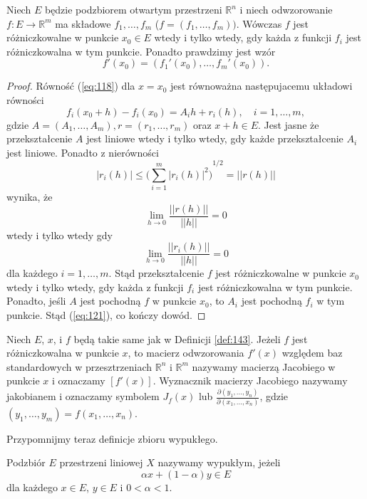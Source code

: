 \documentclass[leqno]{article}
\begin{document}
\begin{justify}
\begin{theorem}
{
    Niech $E$ będzie podzbiorem otwartym przestrzeni $\mathbb{R}^n$ i niech odwzorowanie $f : E \to \mathbb{R}^m$ ma składowe $f_1, \ldots, f_m$ ($f = (f_1, \ldots, f_m))$.
    Wówczas $f$ jest różniczkowalne w punkcie $x_0 \in E$ wtedy i tylko wtedy, gdy każda z funkcji $f_i$ jest różniczkowalna w tym punkcie. Ponadto prawdzimy jest wzór
    \begin{equation}\label{eq:121}
        f'(x_0) = (f_1'(x_0), \ldots, f_m'(x_0)).
    \end{equation}
}
\end{theorem}
\begin{proof}
    Równość (\ref{eq:118}) dla $x = x_0$ jest równoważna następujacemu układowi równości 
    \[
        f_i(x_0 + h) - f_i(x_0) = A_i h + r_i(h), \quad i = 1, \ldots, m,
    \]
    gdzie $A = (A_1, \ldots, A_m), r = (r_1, \ldots, r_m)$ oraz $x + h \in E$. Jest jasne że przekształcenie $A$ jest liniowe 
    wtedy i tylko wtedy, gdy każde przekształcenie $A_i$ jest liniowe. Ponadto z nierówności 
    \[
        |r_i(h)| \leqslant {\Big(\sum_{i=1}^{m}|r_i(h)|^2 \Big)}^{1/2} = ||r(h)||
    \]
    wynika, że 
    \[
        \lim\limits_{h \to 0}\frac{||r(h)||}{||h||} = 0 
    \]
    wtedy i tylko wtedy gdy 
    \[
        \lim\limits_{h \to 0}\frac{||r_i(h)||}{||h||} = 0 
    \]
    dla każdego $i = 1, \ldots, m$. Stąd przekształcenie $f$ jest różniczkowalne w punkcie $x_0$ wtedy i tylko wtedy, gdy
    każda z funkcji $f_i$ jest różniczkowalna w tym punkcie. Ponadto, jeśli $A$ jest pochodną $f$ w punkcie $x_0$, to $A_i$ jest pochodną $f_i$ w tym punkcie.
    Stąd (\ref{eq:121}), co kończy dowód.
\end{proof}

\begin{defn}
    Niech $E$, $x$, i $f$ będą takie same jak w Definicji \ref{def:143}. Jeżeli $f$ jest różniczkowalna w punkcie $x$, to macierz odwzorowania $f'(x)$ względem baz standardowych 
    w przesztrzeniach $\mathbb{R}^n$ i $\mathbb{R}^m$ nazywamy macierzą Jacobiego w punkcie $x$ i oznaczamy $[f'(x)]$.
    Wyznacznik macierzy Jacobiego nazywamy jakobianem i oznaczamy symbolem $J_f(x)$ lub $\frac{\partial(y_1, \ldots, y_n)}{\partial(x_1, \ldots, x_n)}$,
    gdzie $(y_1, \ldots, y_m) = f(x_1, \ldots, x_n)$.
\end{defn}

Przypomnijmy teraz definicje zbioru wypukłego. 

\begin{defn}
    Podzbiór $E$ przestrzeni liniowej $X$ nazywamy wypukłym, jeżeli 
    \[
        \alpha x + (1 - \alpha)y \in E
    \]
    dla każdego $x \in E$, $y \in E$ i $0 < \alpha < 1$.
\end{defn}


\end{justify}
\end{document}
